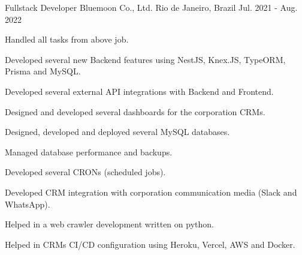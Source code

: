 \begin{cventries}
  \cventry
    {Fullstack Developer} %
    {Bluemoon Co., Ltd.} %
    {Rio de Janeiro, Brazil} %
    {Jul. 2021 -  Aug. 2022} %
    {
      \begin{cvitems} %
        \item {Handled all tasks from above job.}
        \item {Developed several new Backend features using NestJS, Knex.JS, TypeORM, Prisma and MySQL.}
        \item {Developed several external API integrations with Backend and Frontend.}
        \item {Designed and developed several dashboards for the corporation CRMs.}
        \item {Designed, developed and deployed several MySQL databases.}
        \item {Managed database performance and backups.}
        \item {Developed several CRONs (scheduled jobs).}
        \item {Developed CRM integration with corporation communication media (Slack and WhatsApp).}
        \item {Helped in a web crawler development written on python.}
        \item {Helped in CRMs CI/CD configuration using Heroku, Vercel, AWS and Docker.}
      \end{cvitems}
    }

\end{cventries}
